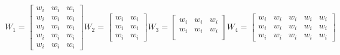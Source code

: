\documentclass[a4paper]{article}
\begin{document}
\begin{equation}
  W_{1}=\begin{bmatrix}
    w_{i} &   w_{i} & w_{i} \\
    w_{i} &   w_{i} & w_{i} \\
    w_{i} &   w_{i} & w_{i} \\
    w_{i} &   w_{i} & w_{i} \\
    w_{i} &   w_{i} & w_{i}
  \end{bmatrix}
  W_{2}=\begin{bmatrix}
    w_{i} &   w_{i} \\
    w_{i} &   w_{i} \\
    w_{i} &   w_{i}
  \end{bmatrix}
  W_{3}=\begin{bmatrix}
    w_{i} &   w_{i} & w_{i} \\
    w_{i} &   w_{i} & w_{i} \\
  \end{bmatrix}
  W_{4}=\begin{bmatrix}
    w_{i} &   w_{i} & w_{i} & w_{i} & w_{i} \\
    w_{i} &   w_{i} & w_{i} & w_{i} & w_{i} \\
    w_{i} &   w_{i} & w_{i} & w_{i} & w_{i}
  \end{bmatrix}
\end{equation}
\end{document}
